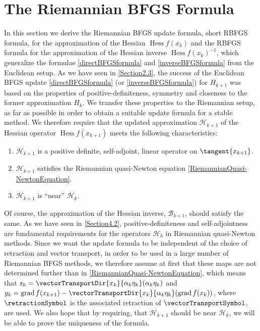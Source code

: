 \section{The Riemannian BFGS Formula}
\label{Section4.3}

In this section we derive the Riemannian BFGS update formula, short RBFGS formula, for the approximation of the Hessian $\operatorname{Hess}f(x_k)$ and the RBFGS formula for the approximation of the Hessian inverse ${\operatorname{Hess}f(x_k)}^{-1}$, which generalize the formulae \cref{directBFGSformula} and \cref{inverseBFGSformula} from the Euclidean setup. As we have seen in \cref{Section2.3}, the success of the Euclidean BFGS update \cref{directBFGSformula} (or \cref{inverseBFGSformula}) for $H_{k+1}$ was based on the properties of positive-definiteness, symmetry and closeness to the former approximation $H_k$. We transfer these properties to the Riemannian setup, as far as possible in order to obtain a suitable update formula for a stable method. We therefore require that the updated approximation $\mathcal{H}_{k+1}$ of the Hessian operator $\operatorname{Hess} f(x_{k+1})$ meets the following characteristics:
\begin{enumerate}
    \item $\mathcal{H}_{k+1}$ is a positive definite, self-adjoint, linear operator on $\tangent{x_{k+1}}$.
    \item $\mathcal{H}_{k+1}$ satisfies the Riemannian quasi-Newton equation \cref{RiemannianQuasi-NewtonEquation}.
    \item $\mathcal{H}_{k+1}$ is “near” $\mathcal{H}_k$.
\end{enumerate}
Of course, the approximation of the Hessian inverse, $\mathcal{B}_{k+1}$, should satisfy the same. As we have seen in \cref{Section4.2}, positive-definiteness and self-adjointness are fundamental requirements for the operators $\mathcal{H}_k$ in Riemannian quasi-Newton methods. Since we want the update formula to be independent of the choice of retraction and vector transport, in order to be used in a large number of Riemannian BFGS methods, we therefore assume at first that these maps are not determined further than in \cref{RiemannianQuasi-NewtonEquation}, which means that $s_k = \vectorTransportDir{x_k}{\alpha_k \eta_k}(\alpha_k \eta_k)$ and $y_k = \operatorname{grad} f(x_{k+1}) - \vectorTransportDir{x_k}{\alpha_k \eta_k}(\operatorname{grad} f(x_k))$, where $\retractionSymbol$ is the associated retraction of $\vectorTransportSymbol$, are used. We also hope that by requiring, that $\mathcal{H}_{k+1}$ should be near $\mathcal{H}_k$, we will be able to prove the uniqueness of the formula. \\
